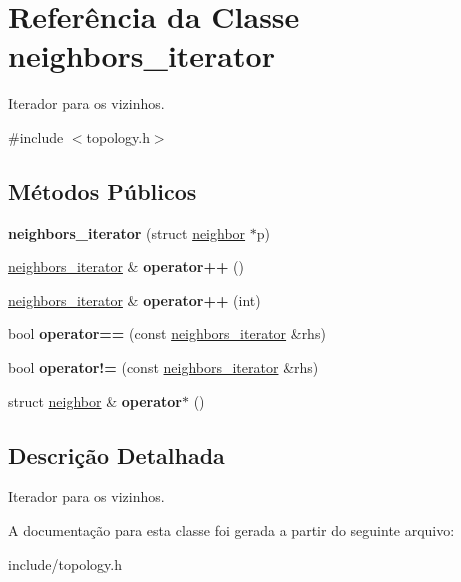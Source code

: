 \hypertarget{classneighbors__iterator}{
\section{Referência da Classe neighbors\_\-iterator}
\label{classneighbors__iterator}
}


Iterador para os vizinhos.  




{\ttfamily \#include $<$topology.h$>$}

\subsection*{Métodos Públicos}
\begin{DoxyCompactItemize}
\item 
\hypertarget{classneighbors__iterator_a88a353f1a5fb55018567df27959fd343}{
{\bfseries neighbors\_\-iterator} (struct \hyperlink{structneighbor}{neighbor} $\ast$p)}
\label{classneighbors__iterator_a88a353f1a5fb55018567df27959fd343}

\item 
\hypertarget{classneighbors__iterator_a97f9d468713bf50e641983c670746044}{
\hyperlink{classneighbors__iterator}{neighbors\_\-iterator} \& {\bfseries operator++} ()}
\label{classneighbors__iterator_a97f9d468713bf50e641983c670746044}

\item 
\hypertarget{classneighbors__iterator_a1068a8a11e8b103cec6bfe5590064cdf}{
\hyperlink{classneighbors__iterator}{neighbors\_\-iterator} \& {\bfseries operator++} (int)}
\label{classneighbors__iterator_a1068a8a11e8b103cec6bfe5590064cdf}

\item 
\hypertarget{classneighbors__iterator_aa1ff48a8fd732bdd6da6f7e6ba407fae}{
bool {\bfseries operator==} (const \hyperlink{classneighbors__iterator}{neighbors\_\-iterator} \&rhs)}
\label{classneighbors__iterator_aa1ff48a8fd732bdd6da6f7e6ba407fae}

\item 
\hypertarget{classneighbors__iterator_ae19a7f3813e79c196b1fe14932c8c255}{
bool {\bfseries operator!=} (const \hyperlink{classneighbors__iterator}{neighbors\_\-iterator} \&rhs)}
\label{classneighbors__iterator_ae19a7f3813e79c196b1fe14932c8c255}

\item 
\hypertarget{classneighbors__iterator_ad13778b03638f20c52101ff95dedff8a}{
struct \hyperlink{structneighbor}{neighbor} \& {\bfseries operator$\ast$} ()}
\label{classneighbors__iterator_ad13778b03638f20c52101ff95dedff8a}

\end{DoxyCompactItemize}


\subsection{Descrição Detalhada}
Iterador para os vizinhos. 

A documentação para esta classe foi gerada a partir do seguinte arquivo:\begin{DoxyCompactItemize}
\item 
include/topology.h\end{DoxyCompactItemize}
